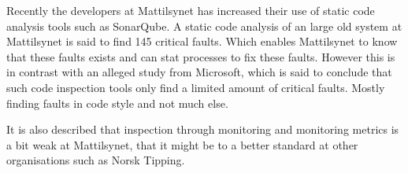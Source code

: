 Recently the developers at Mattilsynet has increased their use of static code analysis tools such as SonarQube. A static code analysis of an large old system at Mattilsynet is said to find 145 critical faults. Which enables Mattilsynet to know that these faults exists and can stat processes to fix these faults. However this is in contrast with an alleged study from Microsoft, which is said to conclude that such code inspection tools only find a limited amount of critical faults. Mostly finding faults in code style and not much else.

It is also described that inspection through monitoring and monitoring metrics is a bit weak at Mattilsynet, that it might be to a better standard at other organisations such as Norsk Tipping.







